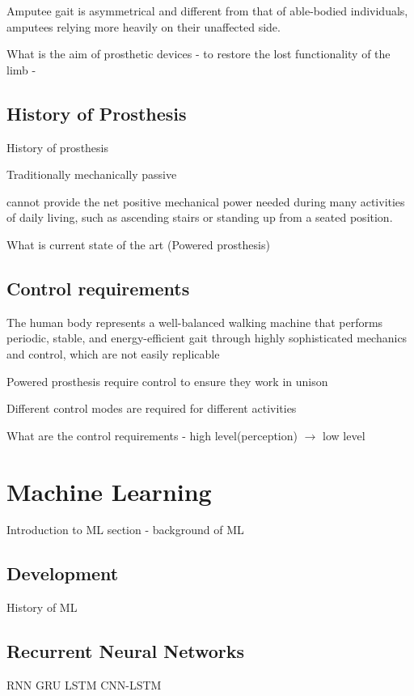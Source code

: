 Amputee gait is asymmetrical and different from that of able-bodied individuals, amputees relying more heavily on their unaffected side.\cite{Bateni2002, Varrecchia2019}

What is the aim of prosthetic devices - to restore the lost functionality of the limb - \cite{Tucker2015}

\subsection{History of Prosthesis}
History of prosthesis

Traditionally mechanically passive

cannot provide the net positive mechanical power needed during many activities of daily living, such as ascending stairs or standing up from a seated position\cite{Simon2013}.

What is current state of the art (Powered prosthesis)


\subsection{Control requirements} %
The human body represents a well-balanced walking machine that performs periodic, stable, and energy-efficient gait through highly sophisticated mechanics and control, which are not easily replicable\cite{Mummolo2013}

Powered prosthesis require control to ensure they work in unison

Different control modes are required for different activities\cite{Simon2013}

What are the control requirements - high level(perception) $\rightarrow$ low level\cite{Tucker2015}


\section{Machine Learning}
Introduction to ML section - background of ML

\subsection{Development}
History of ML

\subsection{Recurrent Neural Networks}
RNN
GRU
LSTM
CNN-LSTM

